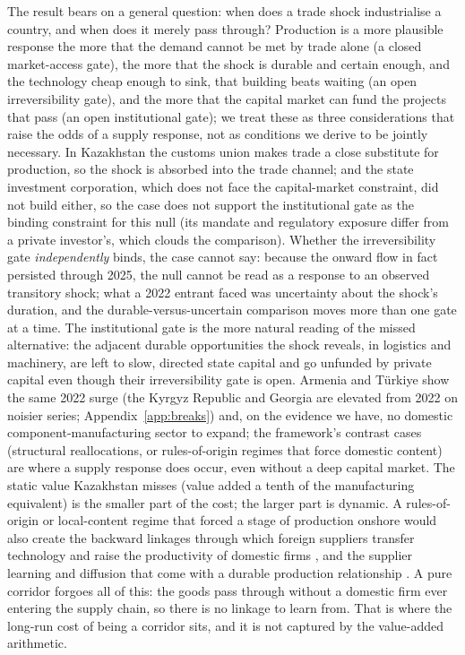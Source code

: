 \documentclass[12pt]{article}
\begin{document}
The result bears on a general question: when does a trade shock industrialise a country, and
when does it merely pass through? Production is a more plausible response the more that the
demand cannot be met by trade alone (a closed market-access gate), the more that the shock is
durable and certain enough, and the technology cheap enough to sink, that building beats
waiting (an open irreversibility gate), and the more that the capital market can fund the
projects that pass (an open institutional gate); we treat these as three considerations that
raise the odds of a supply response, not as conditions we derive to be jointly necessary. In Kazakhstan the customs union makes trade a close substitute for production, so the shock is absorbed into the trade channel; and the state investment corporation, which does not face the capital-market constraint, did not build either, so the case does not support the institutional gate as the binding constraint for this null (its mandate and regulatory exposure differ from a private investor's, which clouds the comparison). Whether the irreversibility
gate \emph{independently} binds, the case cannot say: because the onward flow in fact
persisted through 2025, the null cannot be read as a response to an observed transitory shock;
what a 2022 entrant faced was uncertainty about the shock's duration, and the
durable-versus-uncertain comparison moves more than one gate at a time. The
institutional gate is the more natural reading of the missed alternative: the adjacent durable opportunities the
shock reveals, in logistics and machinery, are left to slow, directed
state capital and go unfunded by private capital even though their irreversibility gate is
open. Armenia and T\"urkiye show the same 2022 surge (the Kyrgyz Republic and Georgia are
elevated from 2022 on noisier series; Appendix~\ref{app:breaks}) and, on the evidence we have, no domestic
component-manufacturing sector to expand; the framework's contrast cases (structural
reallocations, or rules-of-origin regimes that force domestic content) are where a supply
response does occur, even without a deep capital market. The static value Kazakhstan
misses (value added a tenth of the manufacturing equivalent) is the smaller part of the cost;
the larger part is dynamic. A rules-of-origin or local-content
regime that forced a stage of production onshore would also create the backward linkages
through which foreign suppliers transfer technology and raise the productivity of domestic
firms \citep{javorcik2004spillovers}, and the supplier learning and diffusion that come with a
durable production relationship \citep{desouza2024diffusion}. A pure corridor forgoes all of
this: the goods pass through without a domestic firm ever entering the supply chain, so there
is no linkage to learn from. That is where the long-run cost of being a corridor sits, and it
is not captured by the value-added arithmetic.
\end{document}
